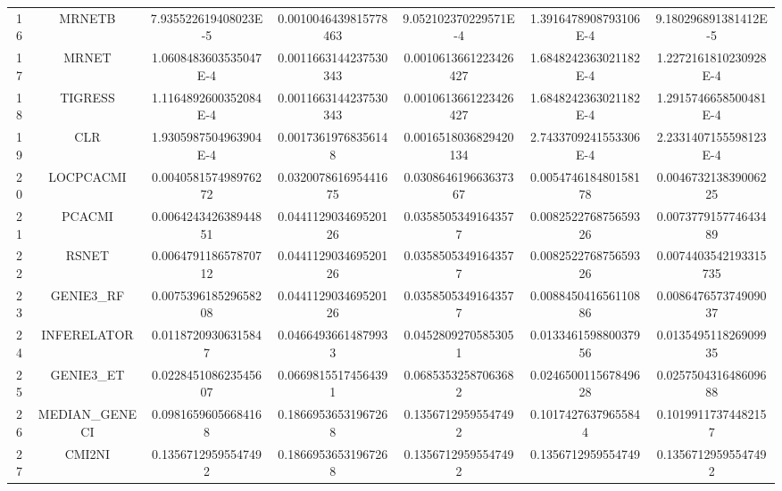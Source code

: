\documentclass[a4paper,10pt]{article}
\begin{document}
\begin{landscape}
\begin{table}[!htp]
\begin{tabular}{ccccccc}
16&MRNETB&7.935522619408023E-5&0.0010046439815778463&9.052102370229571E-4&1.3916478908793106E-4&9.180296891381412E-5\\
17&MRNET&1.0608483603535047E-4&0.0011663144237530343&0.0010613661223426427&1.6848242363021182E-4&1.2272161810230928E-4\\
18&TIGRESS&1.1164892600352084E-4&0.0011663144237530343&0.0010613661223426427&1.6848242363021182E-4&1.2915746658500481E-4\\
19&CLR&1.9305987504963904E-4&0.00173619768356148&0.0016518036829420134&2.7433709241553306E-4&2.2331407155598123E-4\\
20&LOCPCACMI&0.004058157498976272&0.032007861695441675&0.030864619663637367&0.005474618480158178&0.004673213839006225\\
21&PCACMI&0.006424342638944851&0.044112903469520126&0.03585053491643577&0.008252276875659326&0.007377915774643489\\
22&RSNET&0.006479118657870712&0.044112903469520126&0.03585053491643577&0.008252276875659326&0.0074403542193315735\\
23&GENIE3_RF&0.007539618529658208&0.044112903469520126&0.03585053491643577&0.008845041656110886&0.008647657374909037\\
24&INFERELATOR&0.01187209306315847&0.04664936614879933&0.04528092705853051&0.013346159880037956&0.013549511826909935\\
25&GENIE3_ET&0.022845108623545607&0.06698155174564391&0.06853532587063682&0.024650011567849628&0.025750431648609688\\
26&MEDIAN_GENECI&0.09816596056684168&0.18669536531967268&0.13567129595547492&0.10174276379655844&0.10199117374482157\\
27&CMI2NI&0.13567129595547492&0.18669536531967268&0.13567129595547492&0.1356712959554749&0.13567129595547492\\
\hline
\end{tabular}
\end{table}


\newpage


\end{landscape}
\end{document}
